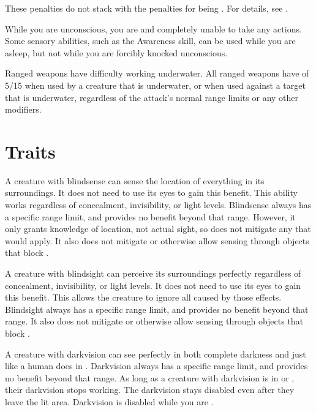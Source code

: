     These penalties do not stack with the penalties for being \partiallyunaware.
    For details, see .

     While you are unconscious, you are \helpless and completely unable to take any actions.
    Some sensory abilities, such as the Awareness skill, can be used while you are asleep, but not while you are forcibly knocked unconscious.

     Ranged weapons have difficulty working underwater.
    All ranged weapons have  of 5/15 when used by a creature that is underwater, or when used against a target that is underwater, regardless of the attack's normal range limits or any other modifiers.

\newpage
\section{Traits}\label{Traits}

        A creature with blindsense can sense the location of everything in its surroundings.
        It does not need to use its eyes to gain this benefit.
        This ability works regardless of concealment, invisibility, or light levels.
        Blindsense always has a specific range limit, and provides no benefit beyond that range.
        However, it only grants knowledge of location, not actual sight, so does not mitigate any  that would apply.
        It also does not mitigate  or otherwise allow sensing through objects that block .

        A creature with blindsight can perceive its surroundings perfectly regardless of concealment, invisibility, or light levels.
        It does not need to use its eyes to gain this benefit.
        This allows the creature to ignore all  caused by those effects.
        Blindsight always has a specific range limit, and provides no benefit beyond that range.
        It also does not mitigate  or otherwise allow sensing through objects that block .

        A creature with darkvision can see perfectly in both complete darkness and  just like a human does in .
        Darkvision always has a specific range limit, and provides no benefit beyond that range.
        As long as a creature with darkvision is in  or , their darkvision stops working.
        The darkvision  stays disabled even after they leave the lit area.
        Darkvision is disabled while you are \dazzled.

